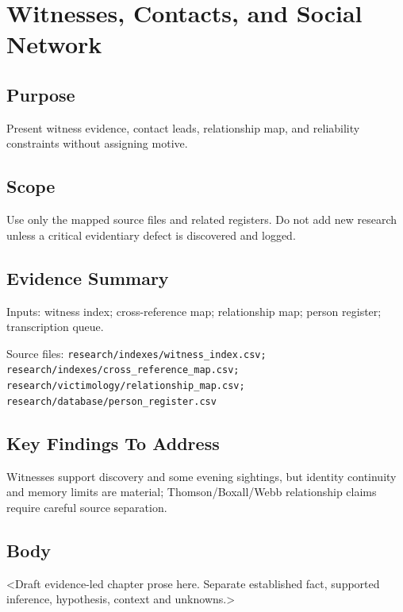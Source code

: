 
\chapter{Witnesses, Contacts, and Social Network}
\label{chap:08-social-network}


\section{Purpose}
Present witness evidence, contact leads, relationship map, and reliability constraints without assigning motive.

\section{Scope}
Use only the mapped source files and related registers. Do not add new research unless a critical evidentiary defect is discovered and logged.

\section{Evidence Summary}
Inputs: witness index; cross-reference map; relationship map; person register; transcription queue.

Source files: \texttt{research/indexes/witness_index.csv; research/indexes/cross_reference_map.csv; research/victimology/relationship_map.csv; research/database/person_register.csv}

\section{Key Findings To Address}
Witnesses support discovery and some evening sightings, but identity continuity and memory limits are material; Thomson/Boxall/Webb relationship claims require careful source separation.

\section{Body}
<Draft evidence-led chapter prose here. Separate established fact, supported inference, hypothesis, context and unknowns.>

